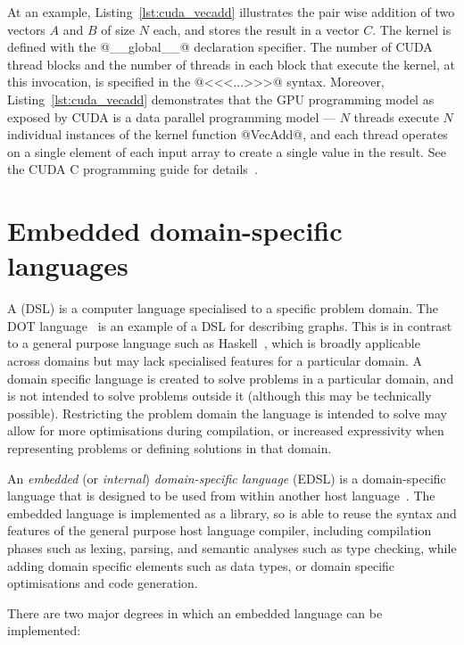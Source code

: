 At an example, Listing~\ref{lst:cuda_vecadd} illustrates the pair wise addition
of two vectors $A$ and $B$ of size $N$ each, and stores the result in a vector
$C$. The kernel is defined with the @__global__@ declaration specifier. The
number of CUDA thread blocks and the number of threads in each block that
execute the kernel, at this invocation, is specified in the @<<<...>>>@ syntax.
Moreover, Listing~\ref{lst:cuda_vecadd} demonstrates that the GPU programming
model as exposed by CUDA is a data parallel programming model --- $N$ threads
execute $N$ individual instances of the kernel function @VecAdd@, and each
thread operates on a single element of each input array to create a single value
in the result. See the CUDA C programming guide for details~\cite{NVIDIA:2012wf}.


\section{Embedded domain-specific languages}
\label{sec:EDSLs}

A  (DSL) is a computer language specialised to
a specific problem domain. The DOT language~\cite{Graphviz:1998ui,Ellson:2001wf}
is an example of a DSL for describing graphs. This is in contrast to a general
purpose language such as Haskell~\cite{Haskell:1998}, which is broadly
applicable across domains but may lack specialised features for a particular
domain. A domain specific language is created to solve problems in a particular
domain, and is not intended to solve problems outside it (although this may be
technically possible). Restricting the problem domain the language is intended
to solve may allow for more optimisations during compilation, or increased
expressivity when representing problems or defining solutions in that domain.

An \emph{embedded} (or \emph{internal}) \emph{domain-specific
language} (EDSL) is a domain-specific
language that is designed to be used from within another host
language~\cite{Hudak:1996}. The embedded language is implemented as a library,
so is able to reuse the syntax and features of the general purpose host language
compiler, including compilation phases such as lexing, parsing, and semantic
analyses such as type checking, while adding domain specific elements such as
data types, or domain specific optimisations and code generation.

There are two major degrees in which an embedded language can be implemented:

